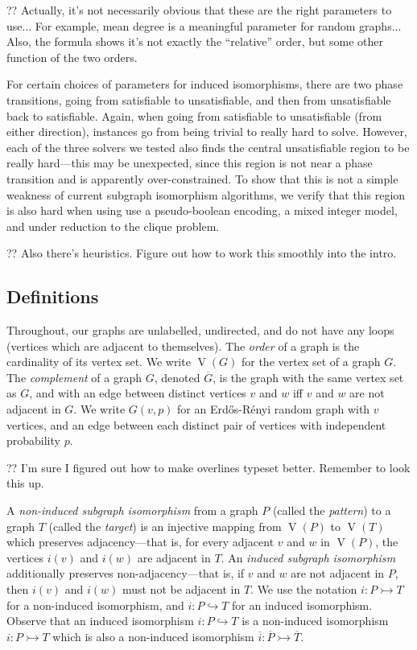 \documentclass[letterpaper]{article}
\begin{document}
?? Actually, it's not necessarily obvious that these are the right parameters to use... For example,
mean degree is a meaningful parameter for random graphs... Also, the formula shows it's not exactly
the ``relative'' order, but some other function of the two orders.

For certain choices of parameters for induced isomorphisms, there are two phase transitions, going
from satisfiable to unsatisfiable, and then from unsatisfiable back to satisfiable. Again, when
going from satisfiable to unsatisfiable (from either direction), instances go from being trivial to
really hard to solve. However, each of the three solvers we tested also finds the central
unsatisfiable region to be really hard---this may be unexpected, since this region is not near a
phase transition and is apparently over-constrained. To show that this is not a simple weakness of
current subgraph isomorphism algorithms, we verify that this region is also hard when using use a
pseudo-boolean encoding, a mixed integer model, and under reduction to the clique problem.

?? Also there's heuristics. Figure out how to work this smoothly into the intro.

\subsection{Definitions}

Throughout, our graphs are unlabelled, undirected, and do not have any loops (vertices which are
adjacent to themselves).  The \emph{order} of a graph is the cardinality of its vertex set. We write
$\operatorname{V}(G)$ for the vertex set of a graph $G$. The \emph{complement} of a graph $G$,
denoted $\overline{G}$, is the
graph with the same vertex set as $G$, and with an edge between distinct vertices $v$ and $w$ iff
$v$ and $w$ are not adjacent in $G$. We write $G(v, p)$ for an Erd\H{o}s-R\'enyi random graph with
$v$ vertices, and an edge between each distinct pair of vertices with independent probability $p$.

?? I'm sure I figured out how to make overlines typeset better. Remember to look this up.

A \emph{non-induced subgraph isomorphism} from a graph $P$ (called the \emph{pattern}) to a graph
$T$ (called the \emph{target}) is an injective mapping from $\operatorname{V}(P)$ to
$\operatorname{V}(T)$ which preserves adjacency---that is, for every adjacent $v$ and $w$ in
$\operatorname{V}(P)$, the vertices $i(v)$ and $i(w)$ are adjacent in $T$. An \emph{induced subgraph
isomorphism} additionally preserves non-adjacency---that is, if $v$ and $w$ are not adjacent in $P$,
then $i(v)$ and $i(w)$ must not be adjacent in $T$. We use the notation $i : P \rightarrowtail T$
for a non-induced isomorphism, and $i : P \hookrightarrow T$ for an induced isomorphism. Observe
that an induced isomorphism $i : P \hookrightarrow T$ is a non-induced isomorphism $i : P
\rightarrowtail T$ which is also a non-induced isomorphism $\overline{i} : \overline{P}
\rightarrowtail \overline{T}$.
\end{document}
